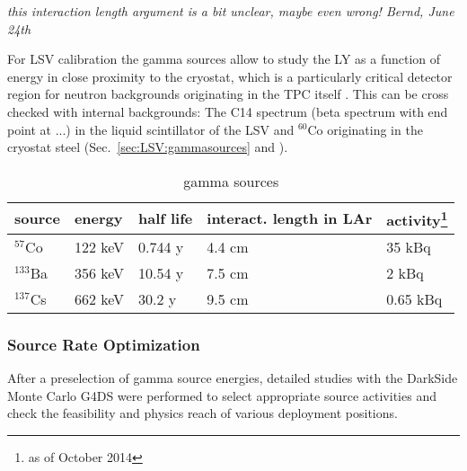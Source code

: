 \textit{this interaction length argument is a bit unclear, maybe even wrong! Bernd, June 24th}


For LSV calibration the gamma sources allow to study the LY as a function of energy in close proximity to the cryostat, which is a particularly critical detector region for neutron backgrounds originating in the TPC itself \cite{wright}. This can be cross checked with internal backgrounds: The C14 spectrum (beta spectrum with end point at ...) in the liquid scintillator of the LSV and $^{60}$Co originating in the cryostat steel (Sec.~\ref{sec:LSV:gammasources} and \cite{DS50:veto:paper}).

\begin{table}[htbp]
\caption{gamma sources}
\begin{tabular}{|l|l|l|l|l|}
\hline
\textbf{source} & \textbf{energy} & \textbf{half life} & \textbf{interact. length in LAr} & \textbf{activity}\footnote{as of October 2014} \\ \hline
$^{57}$Co & 122 keV & 0.744 y & 4.4 cm & 35 kBq \\ \hline
$^{133}$Ba & 356 keV & 10.54 y & 7.5 cm & 2 kBq \\ \hline
$^{137}$Cs & 662 keV & 30.2 y & 9.5 cm & 0.65 kBq \\ \hline
\end{tabular}
\label{tbl:GammaSources}
\end{table}

\subsubsection{Source Rate Optimization}
After a preselection of gamma source energies, detailed studies with the DarkSide Monte Carlo G4DS were performed to select appropriate source activities and check the feasibility and physics reach of various deployment positions.

